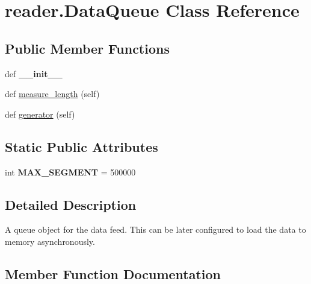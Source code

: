 \hypertarget{classreader_1_1DataQueue}{}\section{reader.\+Data\+Queue Class Reference}
\label{classreader_1_1DataQueue}
\subsection*{Public Member Functions}
\begin{DoxyCompactItemize}
\item 
def {\bfseries \+\_\+\+\_\+init\+\_\+\+\_\+}\hypertarget{classreader_1_1DataQueue_ab9a2c9d3fef5991b47b2c5e4ada7a4e8}{}\label{classreader_1_1DataQueue_ab9a2c9d3fef5991b47b2c5e4ada7a4e8}

\item 
def \hyperlink{classreader_1_1DataQueue_af6e14dd0a81e37dcff0a69044f3c9a01}{measure\+\_\+length} (self)
\item 
def \hyperlink{classreader_1_1DataQueue_a4b4fd15ec3b96973451d120c8f8afcbf}{generator} (self)
\end{DoxyCompactItemize}
\subsection*{Static Public Attributes}
\begin{DoxyCompactItemize}
\item 
int {\bfseries M\+A\+X\+\_\+\+S\+E\+G\+M\+E\+NT} = 500000\hypertarget{classreader_1_1DataQueue_a786dc7054b64a7a3aac0f9a23cdd6bf0}{}\label{classreader_1_1DataQueue_a786dc7054b64a7a3aac0f9a23cdd6bf0}

\end{DoxyCompactItemize}


\subsection{Detailed Description}
\begin{DoxyVerb}A queue object for the data feed. This can be later configured to load the data to
memory asynchronously.
\end{DoxyVerb}
 

\subsection{Member Function Documentation}
